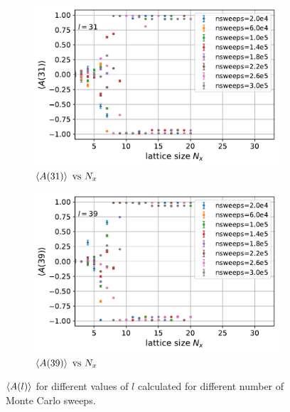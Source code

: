 \documentclass[../journal_main.tex]{subfiles}
\begin{document}
\begin{figure}[!htb]
    \begin{subfigure}[b]{0.47\textwidth}
        \centering
        \includegraphics[width=\textwidth]{images/expval(A_l)_vs_N_x/A vs N_x (l=31).pdf}
        \caption{$\expval{A(31)} \text{ vs } N_x$}
    \end{subfigure}
    \hspace{1em}  %
    \begin{subfigure}[b]{0.47\textwidth}
        \centering
        \includegraphics[width=\textwidth]{images/expval(A_l)_vs_N_x/A vs N_x (l=39).pdf}
        \caption{$\expval{A(39)} \text{ vs } N_x$}
    \end{subfigure}
    \caption{$\expval{A(l)}$ for different values of $l$ calculated for different number of Monte Carlo sweeps.}
\end{figure}
\FloatBarrier
\end{document}
